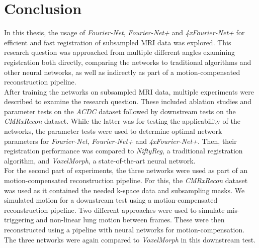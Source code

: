 
\chapter{Conclusion} \label{Ch:Conclusion}
In this thesis, the usage of \emph{Fourier-Net}, \emph{Fourier-Net+} and \emph{4xFourier-Net+} for efficient and fast registration of subsampled MRI data was explored. This research question was approached from multiple different angles examining registration both directly, comparing the networks to traditional algorithms and other neural networks, as well as indirectly as part of a motion-compensated reconstruction pipeline. \\
After training the networks on subsampled MRI data, multiple experiments were described to examine the research question. These included ablation studies and parameter tests on the \emph{ACDC} dataset followed by downstream tests on the \emph{CMRxRecon} dataset. While the latter was for testing the applicability of the networks, the parameter tests were used to determine optimal network parameters for \emph{Fourier-Net}, \emph{Fourier-Net+} and \emph{4xFourier-Net+}. Then, their registration performance was compared to \emph{NiftyReg}, a traditional registration algorithm, and \emph{VoxelMorph}, a state-of-the-art neural network.\\
For the second part of experiments, the three networks were used as part of an motion-compensated reconstruction pipeline. For this, the \emph{CMRxRecon} dataset was used as it contained the needed k-space data and subsampling masks. We simulated motion for a downstream test using a motion-compensated reconstruction pipeline. Two different approaches were used to simulate mis-triggering and non-linear lung motion between frames. These were then reconstructed using a pipeline with neural networks for motion-compensation. The three networks were again compared to \emph{VoxelMorph} in this downstream test.